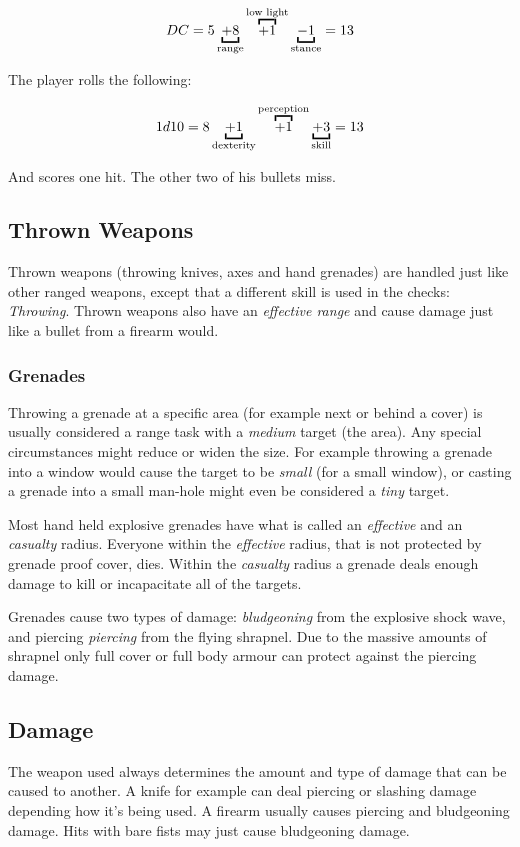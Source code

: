 \[
DC = 5 \ub{+ 8}{range} \ob{+ 1}{low light} \ub{- 1}{stance} = 13
\]

The player rolls the following:

\[
1d10 = 8 \ub{+ 1}{dexterity} \ob{+ 1}{perception} \ub{+ 3}{skill} = 13
\]

And scores one hit. The other two of his bullets miss.

\subsection{Thrown Weapons}

Thrown weapons (throwing knives, axes and hand grenades) are handled just like
other ranged weapons, except that a different skill is used in the checks:
\emph{Throwing}. Thrown weapons also have an \emph{effective range} and cause
damage just like a bullet from a firearm would.

\subsubsection{Grenades}

Throwing a grenade at a specific area (for example next or behind a cover) is
usually considered a range task with a \emph{medium} target (the area). Any
special circumstances might reduce or widen the size. For example throwing a
grenade into a window would cause the target to be \emph{small} (for a small
window), or casting a grenade into a small man-hole might even be considered
a \emph{tiny} target.

Most hand held explosive grenades have what is called an \emph{effective} and
an \emph{casualty} radius. Everyone within the \emph{effective} radius, that is
not protected by grenade proof cover, dies. Within the \emph{casualty} radius
a grenade deals enough damage to kill or incapacitate all of the targets.

Grenades cause two types of damage: \emph{bludgeoning} from the explosive shock
wave, and piercing \emph{piercing} from the flying shrapnel. Due to the massive
amounts of shrapnel only full cover or full body armour can protect against the
piercing damage.

\subsection{Damage}

The weapon used always determines the amount and type of damage that can be
caused to another. A knife for example can deal piercing or slashing damage
depending how it's being used. A firearm usually causes piercing and
bludgeoning damage. Hits with bare fists may just cause bludgeoning damage.

